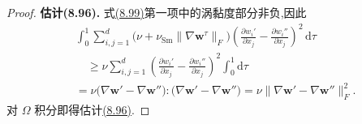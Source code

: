 \begin{lemma}[非线性黏性算子的强单调性]
\begin{proof}
\textbf{估计(8.96).} 式\hyperref[eq:smagorinsky-monotonicity-expansion]{(8.99)}第一项中的涡黏度部分非负,因此
\begin{equation}\label{eq:smagorinsky-monotonicity-viscous-part}
\begin{aligned}
 &\int_0^1\sum_{i,j=1}^{d}
       \bigl(\nu+\nu_{\mathrm{Sm}}\|\nabla\bm{w}^{\tau}\|_F\bigr)
       \left(\frac{\partial w_i'}{\partial x_j}
                    -\frac{\partial w_i''}{\partial x_j}\right)^2
                                                     \,\mathrm{d}\tau\\
 &\quad\ge \nu\sum_{i,j=1}^{d}
       \left(\frac{\partial w_i'}{\partial x_j}
                    -\frac{\partial w_i''}{\partial x_j}\right)^2
       \int_0^1\mathrm{d}\tau\\
 &=\nu\bigl(\nabla\bm{w}'-\nabla\bm{w}''\bigr)
                :\bigl(\nabla\bm{w}'-\nabla\bm{w}''\bigr)
 =\nu\|\nabla\bm{w}'-\nabla\bm{w}''\|_F^2.
\end{aligned}
\end{equation}
对 $\Omega$ 积分即得估计\hyperref[eq:smagorinsky-operator-monotonicity]{(8.96)}.


\end{proof}
\end{lemma}

